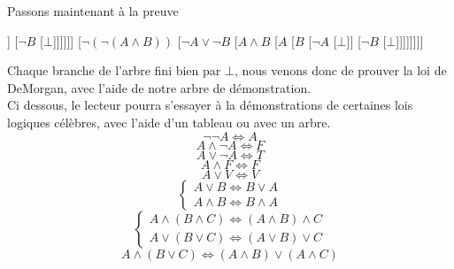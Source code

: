 \documentclass[a4paper, 12pt]{article}
\newcommand{\ffi}{\Leftrightarrow}
\numberwithin{equation}{subsection}
\begin{document}
  Passons maintenant à la preuve
  \begin{center}
  \begin{forest}
  [$\neg (\neg (A \land B) \ffi \neg A \lor \neg B)$
    [$\neg(A \land B)$
    [$\neg (\neg A \lor \neg B)$
    [$A$
    [$B$
    [$\neg A$
    [$\bot$]]
    [$\neg B$
    [$\bot$]]]]]]
    [$\neg (\neg (A \land B))$
    [$ \neg A \lor \neg B$
    [$A \land B$
    [$A$
    [$B$
    [$\neg A$
    [$\bot$]]
    [$\neg B$
    [$\bot$]]]]]]]]
  \end{forest}
\end{center}
Chaque branche de l'arbre fini bien par $\bot$, nous venons donc de prouver la loi de DeMorgan, avec l'aide de notre arbre de démonstration. \\[1.0cm]
    Ci dessous, le lecteur pourra s'essayer à la démonstrations de certaines lois logiques célèbres, avec l'aide d'un tableau ou avec un arbre. \\[1.0cm]
  \begin{equation}\neg \neg A \ffi A \end{equation}
  \begin{equation} A \land \neg A \ffi F \end{equation}
  \begin{equation} A \lor \neg A \ffi T \end{equation}
  \begin{equation} A \land F \ffi F \end{equation}
  \begin{equation} A \lor V \ffi V \end{equation}
  \begin{equation}
    \begin{cases}
      A \lor B \ffi B \lor A \\
      A \land B \ffi B \land A
    \end{cases}
  \end{equation}
  \begin{equation}
    \begin{cases}
      A \land (B \land C) \ffi (A \land B) \land C \\
      A \lor (B \lor C) \ffi (A \lor B) \lor C
    \end{cases}
  \end{equation}
  \begin{equation}A \land (B \lor C) \ffi (A \land B) \lor (A \land C) \end{equation}
\end{document}
